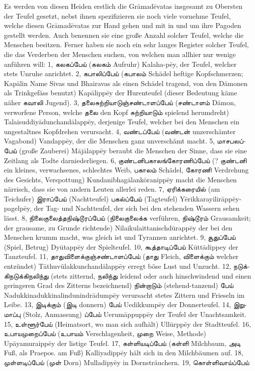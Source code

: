 \documentclass{article}
\newcommand{\TamilText}[1]{\texttamil{#1}}
\newcommand{\tam}[1]{\TamilText{#1}}
\begin{document}
Es werden von diesen Heiden erstlich die Gr\={a}mad\={e}vatas insgesamt zu Obersten der Teufel gesetzt, nebst ihnen spezifizieren sie noch viele vornehme Teufel, welche diesen Gr\={a}mad\={e}vatas zur Hand gehen und mit in und um ihre Pagoden gestellt werden. Auch benennen sie eine große Anzahl solcher Teufel, welche die Menschen besitzen. Ferner haben sie noch ein sehr langes Register solcher Teufel, die das Verderben der Menschen suchen, von welchen man allhier nur wenige anführen will: 1, \tam{கலகப்பேய்} (\tam{கலகம்} Aufruhr) Kalaha-p\={e}y, der Teufel, welcher stets Unruhe anrichtet. 2, \tam{கபாலிப்பேய்} (\tam{கபாலம்} Schädel heftige Kopfschmerzen; Kap\={a}lin Name Sivas und Bhairavas als einen Schädel tragend, von den Dämonen als Trinkgefäss benutzt) Kap\={a}lipp\={e}y der Hurenteufel (dieser Bedeutung käme näher \tam{கவாலி} Jugend). 3, \tam{தலைசுற்றியாடுஞ்சண்டாளப்பேய்} (\tam{சண்டாளம்} Dämon, verworfene Person, welche \tam{தலை} den Kopf \tam{சுற்றியாடும்} spielend herumdreht) Talaisuddiy\={a}dunchand\={a}lapp\={e}y, derjenige Teufel, welcher bei den Menschen ein ungestaltnes Kopfdrehen verursacht. 4, \tam{வண்டப்பேய்} (\tam{வண்டன்} unzerschämter Vagabond) Vandapp\={e}y, der die Menschen ganz unverschämt macht. 5, \tam{மாசபலப்பேய்} (große Zauberei) M\={a}j\={a}lapp\={e}y beraubt die Menschen der Sinne, dass sie eine Zeitlang als Todte darniederliegen. 6, \tam{குண்டனிபகாலங்கோரணிப்பேய்} (? \tam{குண்டனி} ein kleines, verwachsenes, schlechtes Weib, \tam{பகாலம்} Schädel, \tam{கோரணி} Verdrehung des Gesichts, Verspottung) Kundanibhag\={a}lank\={o}ranipp\={e}y macht die Menschen närrisch, dass sie von andern Leuten allerlei reden. 7, \tam{ஏரிக்கரையில்} (am Teichufer) \tam{இராப்பேய்} (Nachtteufel) \tam{பகல்ப்பேய்} (Tagteufel) Y\={e}rikkarayilir\={a}pp\={e}y-pagelp\={e}y, der Tag- und Nachtteufel, der sich bei den stehenden Wassern sehen lässt. 8, \tam{நிலைகுலைத்தநிஷ்டூரப்பேய்} (\tam{நிலைகுலைக்க} verführen, \tam{நிஷ்டூரம்} Grausamkeit; der grausame, zu Grunde richtende) Nilaikulaittanischd\={u}rapp\={e}y der bei den Menschen krumm macht, was gleich ist und Tyrannen anrichtet. 9, \tam{சூதுப்பேய்} (Spiel, Betrug) Dy\={u}tapp\={e}y der Spielteufel. 10, \tam{கூத்தாடிப்பேய்} K\={u}tt\={a}dippey der Tanzteufel. 11, \tam{தாதுவிளைக்குஞ்சண்டாளப்பேய்} (\tam{தாது} Fleich, \tam{விளைக்கும்} welcher entzündet) T\={a}thuvülakkunchand\={a}lapp\={e}y erregt böse Lust und Unzucht. 12, \tam{நடுக்கிநடுக்கிநலிந்து} (stets zitternd, \tam{நலிந்து} leidend oder auch hinschwindend und einen geringeren Grad des Zitterns bezeichnend) \tam{நின்றாடும்} (stehend-tanzend) \tam{பேய்} Nadukkinadukkinalindunindr\={a}dump\={e}y verursacht stetes Zittern und Frieseln im Leibe. 13, \tam{இடிக்கும்} (\tam{இடி} donnern) \tam{பேய்} Uedikkump\={e}y der Donnerteufel. 14, \tam{இறுமாப்பு} (Stolz, Anmassung) \tam{ப்பேய்} Uerum\={a}ppupp\={e}y der Teufel der Unachtsamkeit. 15, \tam{உள்ளூர்பேய்} (Heimatsort, wo man sich aufhält) Ull\={u}rpp\={e}y der Stadtteufel. 16, \tam{உபாயமுறைப்பேய்} (\tam{உபாயம்} Verschlagenheit, \tam{முறை} Weise, Methode) Up\={a}yamuraipp\={e}y der listige Teufel. 17, \tam{கள்ளியடிப்பேய்} (\tam{கள்ளி} Milchbaum, \tam{அடி} Fuß, als Praepos. am Fuß) Kalliyadipp\={e}y hält sich in den Milchbäumen auf. 18, \tam{முள்ளடிப்பேய்} (\tam{முள்} Dorn) Mulladipy\={e}y in Dornsträuchern. 19, \tam{கொள்ளிவாய்ப்பேய்} 
\end{document}
